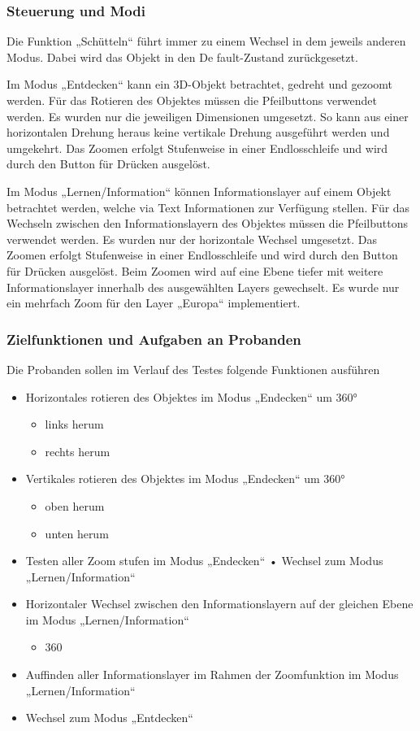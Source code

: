 \documentclass[runningheads,a4paper, 12pt]{llncs}
\begin{document}
\subsubsection{Steuerung und Modi}
Die Funktion „Schütteln“ führt immer zu einem Wechsel in dem jeweils anderen Modus. Dabei wird das Objekt in den De fault-Zustand zurückgesetzt.

Im Modus „Entdecken“ kann ein 3D-Objekt betrachtet, gedreht und gezoomt werden. Für das Rotieren des Objektes müssen die Pfeilbuttons verwendet werden. Es wurden nur die jeweiligen Dimensionen umgesetzt. So kann aus einer horizontalen Drehung heraus keine vertikale Drehung ausgeführt werden und umgekehrt. Das Zoomen erfolgt Stufenweise in einer Endlosschleife und wird durch den Button für Drücken ausgelöst.

Im Modus „Lernen/Information“ können Informationslayer auf einem Objekt betrachtet werden, welche via Text Informationen zur Verfügung stellen. Für das Wechseln zwischen den Informationslayern des Objektes müssen die Pfeilbuttons verwendet werden. Es wurden nur der horizontale Wechsel umgesetzt.
Das Zoomen erfolgt Stufenweise in einer Endlosschleife und wird durch den Button für Drücken ausgelöst. Beim Zoomen wird auf eine Ebene tiefer mit weitere Informationslayer innerhalb des ausgewählten Layers gewechselt.
Es wurde nur ein mehrfach Zoom für den Layer „Europa“ implementiert.
\subsubsection{Zielfunktionen und Aufgaben an Probanden}
Die Probanden sollen im Verlauf des Testes folgende Funktionen ausführen
	\begin{itemize}
	\item Horizontales rotieren des Objektes im Modus „Endecken“ um 360°
	\begin{itemize}
		\item links herum
		\item rechts herum
	\end{itemize}
	\item Vertikales rotieren des Objektes im Modus „Endecken“ um 360°
	\begin{itemize}
		\item oben herum
		\item unten herum
	\end{itemize}
	\item Testen aller Zoom stufen im Modus „Endecken“
	• Wechsel zum Modus „Lernen/Information“
	\item Horizontaler Wechsel zwischen den Informationslayern auf der gleichen Ebene im Modus „Lernen/Information“
	\begin{itemize}
		\item 360
	\end{itemize}
	\item Auffinden aller Informationslayer im Rahmen der Zoomfunktion im Modus „Lernen/Information“
	\item Wechsel zum Modus „Entdecken“
\end{itemize}
\end{document}
